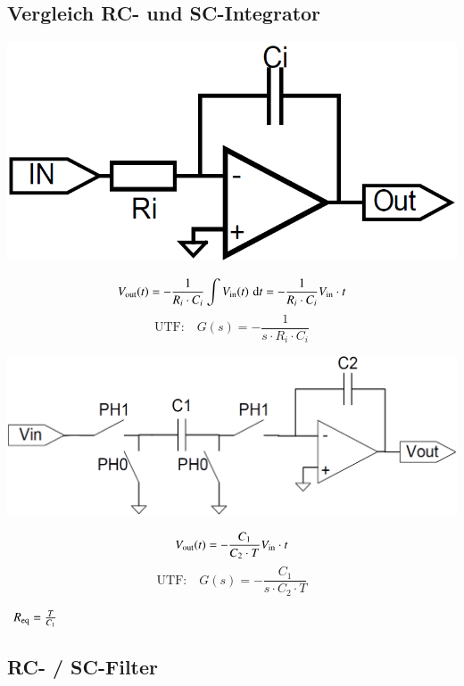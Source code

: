 \subsection{Vergleich RC- und SC-Integrator}

\begin{minipage}[t]{0.55\columnwidth}
    \begin{center}
        \includegraphics[width=0.55\columnwidth]{images/rc_integrator.png}
    \end{center}
    $$ V_{\rm out}(t) = - \frac{1}{R_i \cdot C_i} \int V_{\rm in}(t) \, \mathop{} \! \mathrm{d} t = - \frac{1}{R_i \cdot C_i} V_{\rm in} \cdot t $$
    $$ \text{UTF:} \quad G(s) = - \frac{1}{s \cdot R_i \cdot C_i} $$
\end{minipage}
\hfill
\begin{minipage}[t]{0.42\columnwidth}
    \begin{center}
        \includegraphics[width=\columnwidth]{images/sc_integrator.png}
    \end{center}
    $$ V_{\rm out}(t) = - \frac{C_1}{C_2 \cdot T} V_{\rm in} \cdot t $$
    $$ \text{UTF:} \quad G(s) = - \frac{C_1}{s \cdot C_2 \cdot T} $$
    \begin{center}
        \textrightarrow\ $R_{\rm eq} = \frac{T}{C_1}$
    \end{center}
\end{minipage}


\subsection{RC- / SC-Filter}

